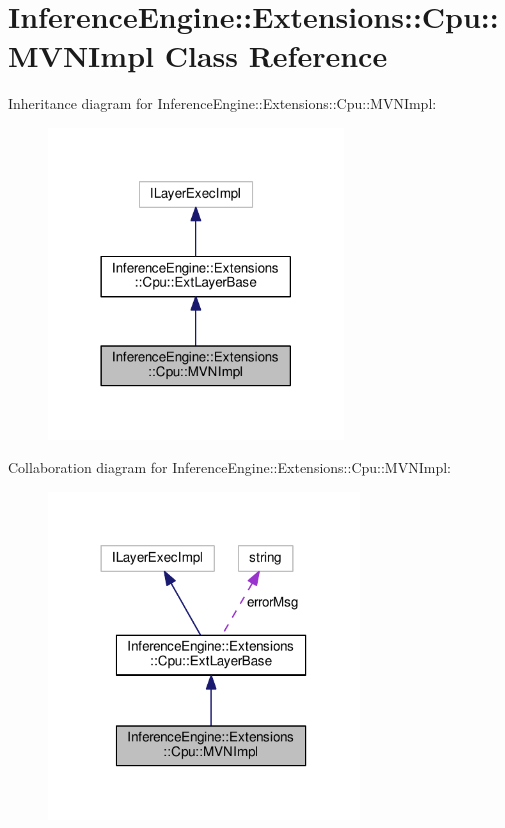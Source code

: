 \hypertarget{classInferenceEngine_1_1Extensions_1_1Cpu_1_1MVNImpl}{}\section{Inference\+Engine\+:\+:Extensions\+:\+:Cpu\+:\+:M\+V\+N\+Impl Class Reference}
\label{classInferenceEngine_1_1Extensions_1_1Cpu_1_1MVNImpl}


Inheritance diagram for Inference\+Engine\+:\+:Extensions\+:\+:Cpu\+:\+:M\+V\+N\+Impl\+:
\nopagebreak
\begin{figure}[H]
\begin{center}
\leavevmode
\includegraphics[width=222pt]{classInferenceEngine_1_1Extensions_1_1Cpu_1_1MVNImpl__inherit__graph}
\end{center}
\end{figure}


Collaboration diagram for Inference\+Engine\+:\+:Extensions\+:\+:Cpu\+:\+:M\+V\+N\+Impl\+:
\nopagebreak
\begin{figure}[H]
\begin{center}
\leavevmode
\includegraphics[width=234pt]{classInferenceEngine_1_1Extensions_1_1Cpu_1_1MVNImpl__coll__graph}
\end{center}
\end{figure}
